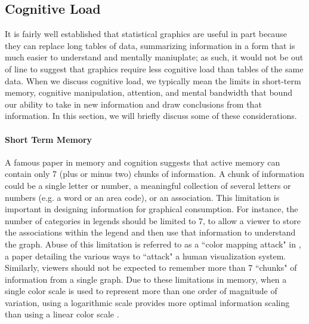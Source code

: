 \documentclass[11pt]{isuthesis}\usepackage[]{graphicx}\usepackage[]{color}
\begin{document}
\subsection{Cognitive Load}\label{cognitiveload}
It is fairly well established that statistical graphics are useful in part because they can replace long tables of data, summarizing information in a form that is much easier to understand and mentally maniuplate; as such, it would not be out of line to suggest that graphics require less cognitive load than tables of the same data. When we discuss cognitive load, we typically mean the limits in short-term memory, cognitive manipulation, attention, and mental bandwidth that bound our ability to take in new information and draw conclusions from that information. In this section, we will briefly discuss some of these considerations. 

\paragraph{Short Term Memory} A famous paper in memory and cognition \citep{miller1956magical} suggests that active memory can contain only 7 (plus or minus two) chunks of information. A chunk of information could be a single letter or number, a meaningful collection of several letters or numbers (e.g. a word or an area code), or an association. This limitation is important in designing information for graphical consumption. For instance,  the number of categories in legends should be limited to 7, to allow a viewer to store the associations within the legend and then use that information to understand the graph. Abuse of this limitation is referred to as a ``color mapping attack" in \citet{conti2005attacking}, a paper detailing the various ways to ``attack" a human visualization system. Similarly, viewers should not be expected to remember more than 7 ``chunks" of information from a single graph. Due to these limitations in memory, when a single color scale is used to represent more than one order of magnitude of variation, using a logarithmic scale provides more optimal information scaling than using a linear color scale \citep{sun2012framework, varshney2013we}. 
\end{document}
